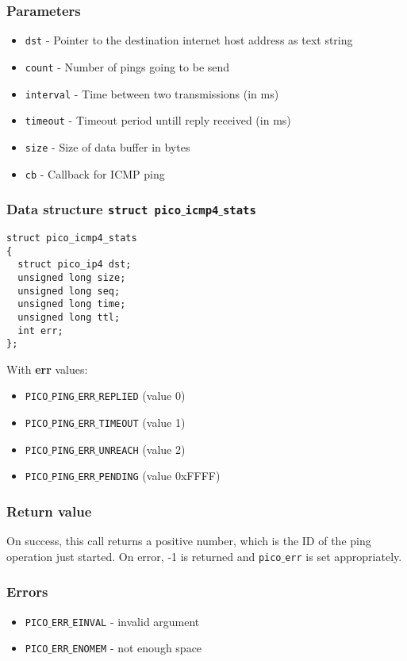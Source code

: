 \subsubsection*{Parameters}
\begin{itemize}[noitemsep]
\item \texttt{dst} - Pointer to the destination internet host address as text string
\item \texttt{count} - Number of pings going to be send
\item \texttt{interval} - Time between two transmissions (in ms)
\item \texttt{timeout} - Timeout period untill reply received (in ms)
\item \texttt{size} - Size of data buffer in bytes
\item \texttt{cb} - Callback for ICMP ping
\end{itemize}

\subsubsection*{Data structure \texttt{struct pico$\_$icmp4$\_$stats}}
\begin{verbatim}
struct pico_icmp4_stats
{
  struct pico_ip4 dst;
  unsigned long size;
  unsigned long seq;
  unsigned long time;
  unsigned long ttl;
  int err;
};
\end{verbatim}
With \textbf{err} values:
\begin{itemize}[noitemsep]
\item \texttt{PICO$\_$PING$\_$ERR$\_$REPLIED} (value 0)
\item \texttt{PICO$\_$PING$\_$ERR$\_$TIMEOUT} (value 1)
\item \texttt{PICO$\_$PING$\_$ERR$\_$UNREACH} (value 2)
\item \texttt{PICO$\_$PING$\_$ERR$\_$PENDING} (value 0xFFFF)
\end{itemize}

\subsubsection*{Return value}
On success, this call returns a positive number, which is the ID of the ping operation just started.
On error, -1 is returned and \texttt{pico$\_$err} is set appropriately.

\subsubsection*{Errors}
\begin{itemize}[noitemsep]
\item \texttt{PICO$\_$ERR$\_$EINVAL} - invalid argument
\item \texttt{PICO$\_$ERR$\_$ENOMEM} - not enough space
\end{itemize}

